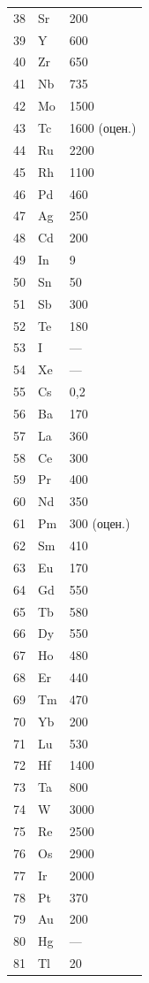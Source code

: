 \documentclass[12pt,a4paper]{article}
\begin{document}
\begin{longtable}{p{0.6cm}p{1.2cm}p{2.5cm}}
		38 & Sr & 200 \\
		39 & Y  & 600 \\
		40 & Zr & 650 \\
		41 & Nb & 735 \\
		42 & Mo & 1500 \\
		43 & Tc & 1600 (оцен.) \\
		44 & Ru & 2200 \\
		45 & Rh & 1100 \\
		46 & Pd & 460 \\
		47 & Ag & 250 \\
		48 & Cd & 200 \\
		49 & In & 9 \\
		50 & Sn & 50 \\
		51 & Sb & 300 \\
		52 & Te & 180 \\
		53 & I  & — \\
		54 & Xe & — \\
		55 & Cs & 0,2 \\
		56 & Ba & 170 \\
		57 & La & 360 \\
		58 & Ce & 300 \\
		59 & Pr & 400 \\
		60 & Nd & 350 \\
		61 & Pm & 300 (оцен.) \\
		62 & Sm & 410 \\
		63 & Eu & 170 \\
		64 & Gd & 550 \\
		65 & Tb & 580 \\
		66 & Dy & 550 \\
		67 & Ho & 480 \\
		68 & Er & 440 \\
		69 & Tm & 470 \\
		70 & Yb & 200 \\
		71 & Lu & 530 \\
		72 & Hf & 1400 \\
		73 & Ta & 800 \\
		74 & W  & 3000 \\
		75 & Re & 2500 \\
		76 & Os & 2900 \\
		77 & Ir & 2000 \\
		78 & Pt & 370 \\
		79 & Au & 200 \\
		80 & Hg & — \\
		81 & Tl & 20 \\

\end{longtable}
\end{document}
